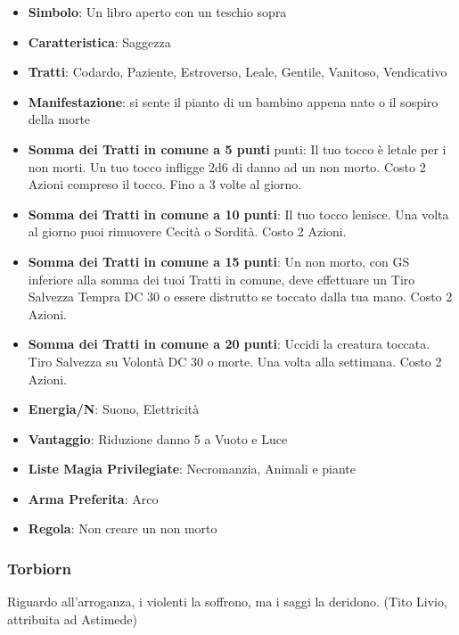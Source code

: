 \begin{multicols}{2}
\begin{itemize}[leftmargin=*] \setlength{\itemsep}{0pt}
\item \textbf{Simbolo}: Un libro aperto con un teschio sopra
\item \textbf{Caratteristica}: Saggezza
\item \textbf{Tratti}: Codardo, Paziente, Estroverso, Leale, Gentile, Vanitoso, Vendicativo
\item \textbf{Manifestazione}: si sente il pianto di un bambino appena nato o il sospiro della morte
\item \textbf{Somma dei Tratti in comune a 5 punti} punti: Il tuo tocco è letale per i non morti. Un tuo tocco infligge 2d6 di danno ad un non morto. Costo 2 Azioni compreso il tocco. Fino a 3 volte al giorno.
\item \textbf{Somma dei Tratti in comune a 10 punti}: Il tuo tocco lenisce. Una volta al giorno puoi rimuovere Cecità o Sordità. Costo 2 Azioni.
\item \textbf{Somma dei Tratti in comune a 15 punti}: Un non morto, con GS inferiore alla somma dei tuoi Tratti in comune, deve effettuare un Tiro Salvezza Tempra DC 30 o essere distrutto se toccato dalla tua mano. Costo 2 Azioni.
\item \textbf{Somma dei Tratti in comune a 20 punti}: Uccidi la creatura toccata. Tiro Salvezza su Volontà DC 30 o morte. Una volta alla settimana. Costo 2 Azioni.
\item \textbf{Energia/N}: Suono, Elettricità
\item \textbf{Vantaggio}: Riduzione danno 5 a Vuoto e Luce
\item \textbf{Liste Magia Privilegiate}: Necromanzia, Animali e piante
\item \textbf{Arma Preferita}: Arco
\item \textbf{Regola}: Non creare un non morto
\end{itemize}

\subsubsection{Torbiorn}\label{torbion}\hypertarget{torbiorn}{}

\begin{changemargin}{0.3cm}{0.3cm}\begin{enfasi}{
Riguardo all'arroganza, i violenti la soffrono, ma i saggi la deridono. (Tito Livio, attribuita ad Astimede)
}\end{enfasi}\end{changemargin}\medskip


\end{multicols}
